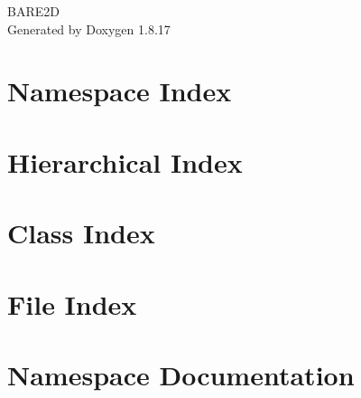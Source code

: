 \let\mypdfximage\pdfximage\def\pdfximage{\immediate\mypdfximage}\documentclass[twoside]{book}
\newcommand{\+}{\discretionary{\mbox{\scriptsize$\hookleftarrow$}}{}{}}
\newcommand{\clearemptydoublepage}{%
  \newpage{\pagestyle{empty}\cleardoublepage}%
}
\begin{document}
\hypersetup{pageanchor=false,
             bookmarksnumbered=true,
             pdfencoding=unicode
            }
\begin{titlepage}
\vspace*{7cm}
\begin{center}%
{\Large B\+A\+R\+E2D }\\
\vspace*{1cm}
{\large Generated by Doxygen 1.8.17}\\
\end{center}
\end{titlepage}
\clearemptydoublepage
{}
\tableofcontents
\clearemptydoublepage
{}
\hypersetup{pageanchor=true}

\chapter{Namespace Index}

\chapter{Hierarchical Index}

\chapter{Class Index}

\chapter{File Index}

\chapter{Namespace Documentation}




\end{document}
